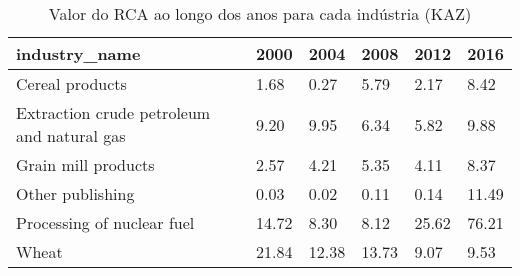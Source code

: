 \begin{table}
\centering
\caption{Valor do RCA ao longo dos anos para cada indústria (KAZ)}
\begin{tabular}{p{6cm}p{1.5cm}p{1.5cm}p{1.5cm}p{1.5cm}p{1.5cm}}
\toprule
                             industry\_name &  2000 &  2004 &  2008 &  2012 &  2016 \\
\midrule
                           Cereal products &  1.68 &  0.27 &  5.79 &  2.17 &  8.42 \\
Extraction crude petroleum and natural gas &  9.20 &  9.95 &  6.34 &  5.82 &  9.88 \\
                       Grain mill products &  2.57 &  4.21 &  5.35 &  4.11 &  8.37 \\
                          Other publishing &  0.03 &  0.02 &  0.11 &  0.14 & 11.49 \\
                Processing of nuclear fuel & 14.72 &  8.30 &  8.12 & 25.62 & 76.21 \\
                                     Wheat & 21.84 & 12.38 & 13.73 &  9.07 &  9.53 \\
\bottomrule
\end{tabular}
\end{table}
